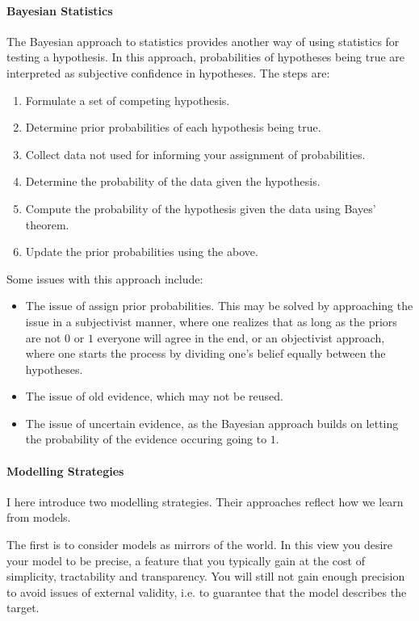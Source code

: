 \paragraph{Bayesian Statistics}
The Bayesian approach to statistics provides another way of using statistics for testing a hypothesis. In this approach, probabilities of hypotheses being true are interpreted as subjective confidence in hypotheses. The steps are:
\begin{enumerate}
	\item Formulate a set of competing hypothesis.
	\item Determine prior probabilities of each hypothesis being true.
	\item Collect data not used for informing your assignment of probabilities.
	\item Determine the probability of the data given the hypothesis.
	\item Compute the probability of the hypothesis given the data using Bayes' theorem.
	\item Update the prior probabilities using the above.
\end{enumerate}

Some issues with this approach include:
\begin{itemize}
	\item The issue of assign prior probabilities. This may be solved by approaching the issue in a subjectivist manner, where one realizes that as long as the priors are not $0$ or $1$ everyone will agree in the end, or an objectivist approach, where one starts the process by dividing one's belief equally between the hypotheses.
	\item The issue of old evidence, which may not be reused.
	\item The issue of uncertain evidence, as the Bayesian approach builds on letting the probability of the evidence occuring going to $1$.
\end{itemize}

\paragraph{Modelling Strategies}
I here introduce two modelling strategies. Their approaches reflect how we learn from models.

The first is to consider models as mirrors of the world. In this view you desire your model to be precise, a feature that you typically gain at the cost of simplicity, tractability and transparency. You will still not gain enough precision to avoid issues of external validity, i.e. to guarantee that the model describes the target.

